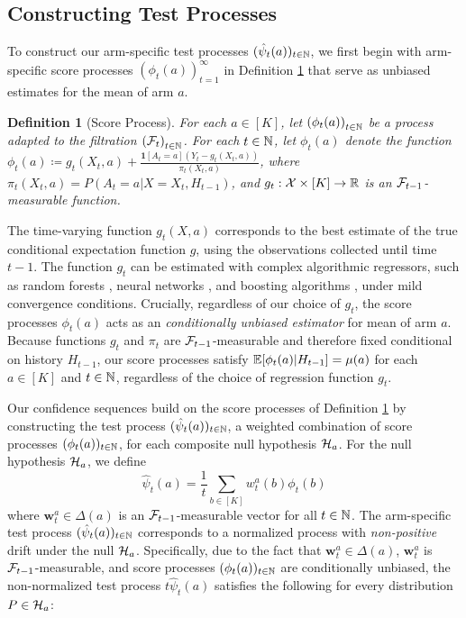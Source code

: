 \documentclass{article}
\newtheorem{definition}{Definition}
\begin{document}
\subsection{Constructing Test Processes}

To construct our arm-specific test processes $(\hat\psi_t(a))_{t \in \mathbb{N}}$, we first begin with arm-specific score processes $(\phi_t(a))_{t=1}^\infty$ in Definition \ref{defn:score_process} that serve as unbiased estimates for the mean of arm $a$. 

\begin{definition}[Score Process]\label{defn:score_process}
    For each $a \in [K]$, let $\left(\phi_t(a)\right)_{t \in \mathbb{N}}$ be a process adapted to the filtration $\left(\mathcal{F}_t\right)_{t \in \mathbb{N}}$. For each $t \in \mathbb{N}$, let $\phi_t(a)$ denote the function $\phi_t(a) \coloneqq g_t(X_t, a) + \frac{\mathbf{1}[A_t = a](Y_t - g_t(X_t, a))}{\pi_t(X_t, a)}$, where $\pi_t(X_t, a) = P(A_t=a|X=X_t,H_{t-1})$, and $g_t: \mathcal{X}\times [K] \rightarrow \mathbb{R}$ is an $\mathcal{F}_{t-1}$-measurable function. 
\end{definition}
The time-varying function $g_t(X,a)$ corresponds to the best estimate of the true conditional expectation function $g$, using the observations collected until time $t-1$. The function $g_t$ can be estimated with complex algorithmic regressors, such as random forests \citep{random_forests}, neural networks \citep{pmlr-v70-shalit17a}, and boosting algorithms \citep{K_nzel_2019}, under mild convergence conditions. Crucially, regardless of our choice of $g_t$, the score processes $\phi_t(a)$ acts as an \textit{conditionally unbiased estimator} for mean of arm $a$. Because functions $g_t$ and $\pi_t$ are $\mathcal{F}_{t-1}$-measurable and therefore fixed conditional on history $H_{t-1}$, our score processes satisfy $\mathbb{E}[\phi_{t}(a)|H_{t-1}] = \mu(a)$ for each $a \in [K]$ and $t \in \mathbb{N}$, regardless of the choice of regression function $g_t$. 

Our confidence sequences build on the score processes of Definition \ref{defn:score_process} by constructing the test process $(\hat\psi_t(a))_{t \in \mathbb{N}}$, a weighted combination of score processes $(\phi_t(a))_{t \in \mathbb{N}}$, for each composite null hypothesis $\mathcal{H}_a$. For the null hypothesis $\mathcal{H}_a$, we define 
\begin{equation}
    \hat\psi_t(a) = \frac{1}{t}\sum_{b \in [K]} w_t^a(b) \phi_t(b)
\end{equation}
where $\bm{w}_t^a \in \Delta(a)$ is an $\mathcal{F}_{t-1}$-measurable vector for all $t \in \mathbb{N}$. The arm-specific test process $(\hat\psi_t(a))_{t \in \mathbb{N}}$ corresponds to a normalized process with \textit{non-positive} drift under the null $\mathcal{H}_a$. Specifically, due to the fact that $\bm{w}_t^a \in \Delta(a)$, $\bm{w}_t^a$ is $\mathcal{F}_{t-1}$-measurable, and score processes $(\phi_t(a))_{t \in \mathbb{N}}$ are conditionally unbiased, the non-normalized test process $t\hat\psi_t(a)$ satisfies the following for every distribution $P \in \mathcal{H}_a$:
\end{document}
